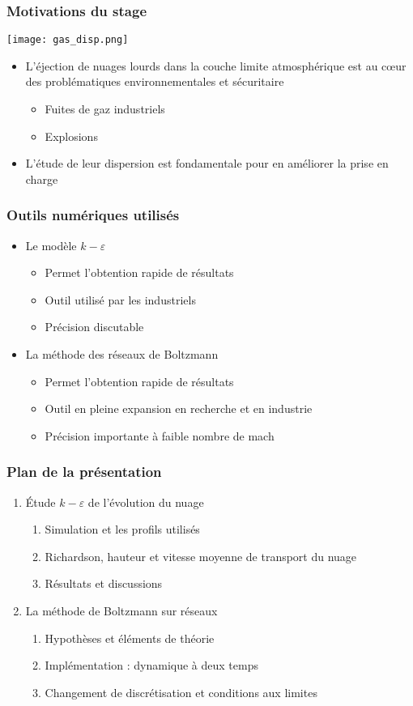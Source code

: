\documentclass[12pt, xcolor=svgnames]{beamer}
\newcommand{\keps}{$k-\varepsilon$}
\newcommand\dsb{\color{dsb}}
\newcommand{\bwarrow}{\item[\color{DarkRed} \ding{227}]}
\newcommand{\warrow}{\item[\color{blue!50!black!70} \tiny{\ding{109}}]}
\begin{document}
\begin{frame}
\frametitle{Motivations du stage}
\begin{center}
\texttt{[image: gas\_disp.png]}
\end{center}

\begin{itemize}
	\bwarrow L'éjection de nuages lourds dans la couche limite atmosphérique est au cœur des problématiques environnementales et sécuritaire
		\begin{itemize}
			\warrow Fuites de gaz industriels
			\warrow Explosions
		\end{itemize}
	\bwarrow L'étude de leur dispersion est fondamentale pour en améliorer la prise en charge \\
\end{itemize}
\end{frame}

\begin{frame}
\frametitle{Outils numériques utilisés}
\begin{itemize}
	\bwarrow Le modèle \keps 
		\begin{itemize}
			\warrow Permet l'obtention rapide de résultats
			\warrow Outil utilisé par les industriels
			\warrow Précision discutable \\[1cm]
		\end{itemize}
	\bwarrow La méthode des réseaux de Boltzmann
		\begin{itemize}
			\warrow Permet l'obtention rapide de résultats
			\warrow Outil en pleine expansion en recherche et en industrie
			\warrow Précision importante à faible nombre de mach 
			\end{itemize}
\end{itemize}
\end{frame}

\begin{frame}
	\frametitle{Plan de la présentation}
	\begin{enumerate}
		\item Étude \keps $ $ de l'évolution du nuage
		\begin{enumerate}[\dsb 1.]
			\item Simulation et les profils utilisés\\
			\item Richardson, hauteur et vitesse moyenne de transport du nuage\\
			\item Résultats et discussions
		\end{enumerate}
		\vspace{1cm}
		\item La méthode de Boltzmann sur réseaux
		\begin{enumerate}[\dsb 1.]
			\item Hypothèses et éléments de théorie \\
			\item Implémentation : dynamique à deux temps\\
			\item Changement de discrétisation et conditions aux limites  			
		\end{enumerate}
	\end{enumerate}
\end{frame}
\end{document}
